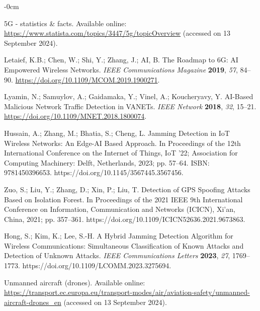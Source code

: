 \documentclass[futureinternet,article,submit,pdftex,moreauthors]{Definitions/mdpi}
\begin{document}
\begin{adjustwidth}{-\extralength}{0cm}


\begin{thebibliography}{999}

5G - statistics \& facts. Available online: \url{https://www.statista.com/topics/3447/5g/topicOverview} (accessed on 13 September 2024).

Letaief, K.B.; Chen, W.; Shi, Y.; Zhang, J.; AI, B. The Roadmap to 6G: AI Empowered Wireless Networks. {\em IEEE Communications Magazine} {\bf 2019}, {\em 57}, 84--90. \url{https://doi.org/10.1109/MCOM.2019.1900271}.

Lyamin, N.; Samuylov, A.; Gaidamaka, Y.; Vinel, A.; Koucheryavy, Y. AI-Based Malicious Network Traffic Detection in VANETs. {\em IEEE Network} {\bf 2018}, {\em 32}, 15--21. \url{https://doi.org/10.1109/MNET.2018.1800074}.

Hussain, A.; Zhang, M.; Bhatia, S.; Cheng, L. Jamming Detection in IoT Wireless Networks: An Edge-AI Based Approach. In Proceedings of the 12th International Conference on the Internet of Things, IoT ’22; Association for Computing Machinery: Delft, Netherlands, 2023; pp. 57--64. ISBN: 9781450396653. https://doi.org/10.1145/3567445.3567456.

Zuo, S.; Liu, Y.; Zhang, D.; Xin, P.; Liu, T. Detection of GPS Spoofing Attacks Based on Isolation Forest. In Proceedings of the 2021 IEEE 9th International Conference on Information, Communication and Networks (ICICN), Xi'an, China, 2021; pp. 357--361. https://doi.org/10.1109/ICICN52636.2021.9673863.

Hong, S.; Kim, K.; Lee, S.-H. A Hybrid Jamming Detection Algorithm for Wireless Communications: Simultaneous Classification of Known Attacks and Detection of Unknown Attacks. {\em IEEE Communications Letters} {\bf 2023}, {\em 27}, 1769--1773. https://doi.org/10.1109/LCOMM.2023.3275694.

Unmanned aircraft (drones). Available online: \url{https://transport.ec.europa.eu/transport-modes/air/aviation-safety/unmanned-aircraft-drones_en} (accessed on 13 September 2024).


\end{thebibliography}
\end{adjustwidth}
\end{document}
